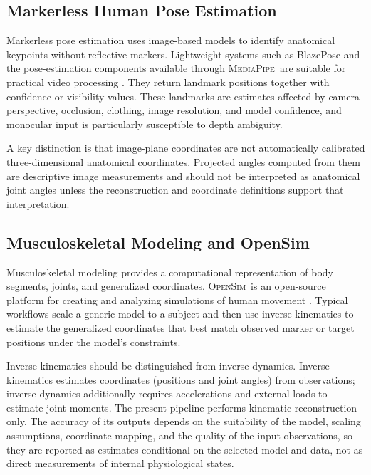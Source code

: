 \documentclass[11pt,a4paper]{article}
\newcommand{\OpenSim}{\textsc{OpenSim}}
\newcommand{\MediaPipe}{\textsc{MediaPipe}}
\begin{document}
\subsection{Markerless Human Pose Estimation}

Markerless pose estimation uses image-based models to identify anatomical keypoints without reflective markers. Lightweight systems such as BlazePose and the pose-estimation components available through \MediaPipe\ are suitable for practical video processing \cite{bazarevsky2020,mediapipe}. They return landmark positions together with confidence or visibility values. These landmarks are estimates affected by camera perspective, occlusion, clothing, image resolution, and model confidence, and monocular input is particularly susceptible to depth ambiguity.

A key distinction is that image-plane coordinates are not automatically calibrated three-dimensional anatomical coordinates. Projected angles computed from them are descriptive image measurements and should not be interpreted as anatomical joint angles unless the reconstruction and coordinate definitions support that interpretation.

\subsection{Musculoskeletal Modeling and OpenSim}

Musculoskeletal modeling provides a computational representation of body segments, joints, and generalized coordinates. \OpenSim\ is an open-source platform for creating and analyzing simulations of human movement \cite{delp2007,seth2018}. Typical workflows scale a generic model to a subject and then use inverse kinematics to estimate the generalized coordinates that best match observed marker or target positions under the model's constraints.

Inverse kinematics should be distinguished from inverse dynamics. Inverse kinematics estimates coordinates (positions and joint angles) from observations; inverse dynamics additionally requires accelerations and external loads to estimate joint moments. The present pipeline performs kinematic reconstruction only. The accuracy of its outputs depends on the suitability of the model, scaling assumptions, coordinate mapping, and the quality of the input observations, so they are reported as estimates conditional on the selected model and data, not as direct measurements of internal physiological states.
\end{document}
